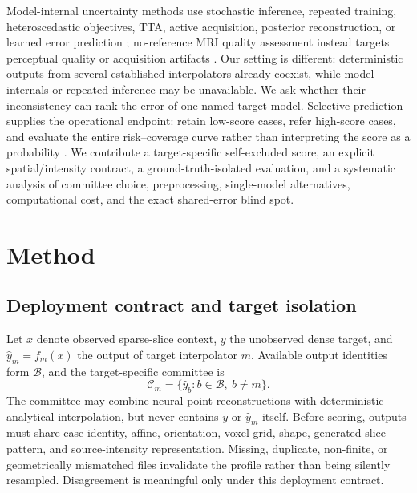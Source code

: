 \documentclass{article}
\begin{document}
Model-internal uncertainty methods use stochastic inference, repeated training, heteroscedastic objectives, TTA, active acquisition, posterior reconstruction, or learned error prediction \cite{gal2016dropout,lakshminarayanan2017deepensembles,kendall2017uncertainties,wang2018tta,edupuganti2021uqmri,kuestner2024ensembles,zhang2019active,shaw2020heteroscedastic,hu2021predict,zhang2024trainingfree}; no-reference MRI quality assessment instead targets perceptual quality or acquisition artifacts \cite{stepien2022nriqa}. Our setting is different: deterministic outputs from several established interpolators already coexist, while model internals or repeated inference may be unavailable. We ask whether their inconsistency can rank the error of one named target model. Selective prediction supplies the operational endpoint: retain low-score cases, refer high-score cases, and evaluate the entire risk--coverage curve rather than interpreting the score as a probability \cite{elyaniv2010selective,geifman2019selectivenet,ding2020aurc,kompa2021second}. We contribute a target-specific self-excluded score, an explicit spatial/intensity contract, a ground-truth-isolated evaluation, and a systematic analysis of committee choice, preprocessing, single-model alternatives, computational cost, and the exact shared-error blind spot.

\section{Method}
\subsection{Deployment contract and target isolation}
Let $x$ denote observed sparse-slice context, $y$ the unobserved dense target, and $\hat y_m=f_m(x)$ the output of target interpolator $m$. Available output identities form $\mathcal B$, and the target-specific committee is
\begin{equation}
 \mathcal C_m=\{\hat y_b:b\in\mathcal B,\ b\neq m\}.
 \label{eq:committee}
\end{equation}
The committee may combine neural point reconstructions with deterministic analytical interpolation, but never contains $y$ or $\hat y_m$ itself. Before scoring, outputs must share case identity, affine, orientation, voxel grid, shape, generated-slice pattern, and source-intensity representation. Missing, duplicate, non-finite, or geometrically mismatched files invalidate the profile rather than being silently resampled. Disagreement is meaningful only under this deployment contract.
\end{document}
